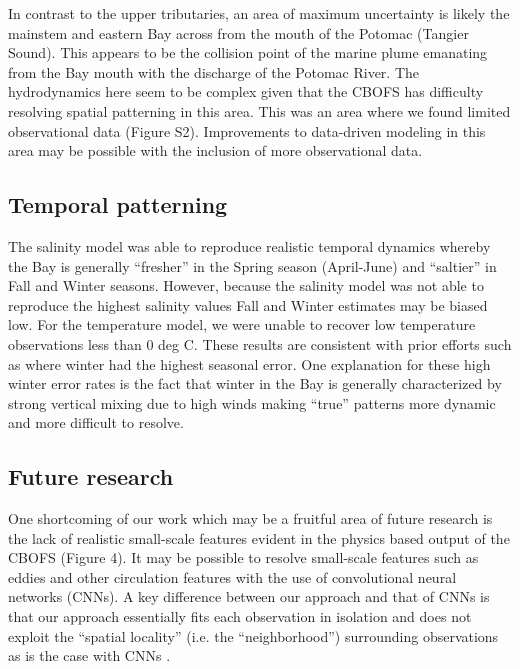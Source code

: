 \documentclass{article}
\begin{document}
In contrast to the upper tributaries, an area of maximum uncertainty is likely the mainstem and eastern Bay across from the mouth of the Potomac (Tangier Sound). This appears to be the collision point of the marine plume emanating from the Bay mouth with the discharge of the Potomac River. The hydrodynamics here seem to be complex given that the CBOFS has difficulty resolving spatial patterning in this area. This was an area where we found limited observational data (Figure S2). Improvements to data-driven modeling in this area may be possible with the inclusion of more observational data.

\subsection{Temporal patterning}

The salinity model was able to reproduce realistic temporal dynamics whereby the Bay is generally “fresher” in the Spring season (April-June) and “saltier” in Fall and Winter seasons. However, because the salinity model was not able to reproduce the highest salinity values Fall and Winter estimates may be biased low. For the temperature model, we were unable to recover low temperature observations less than 0 deg C. These results are consistent with prior efforts such as \citet{geigerSatellitederivedCoastalOcean2013} where winter had the highest seasonal error. One explanation for these high winter error rates is the fact that winter in the Bay is generally characterized by strong vertical mixing due to high winds \citep{sonWaterPropertiesChesapeake2012, xuClimateForcingSalinity2012} making “true” patterns more dynamic and more difficult to resolve.


\subsection{Future research}

One shortcoming of our work which may be a fruitful area of future research is the lack of realistic small-scale features evident in the physics based output of the CBOFS (Figure 4). It may be possible to resolve small-scale features such as eddies and other circulation features with the use of convolutional neural networks (CNNs). A key difference between our approach and that of CNNs is that our approach essentially fits each observation in isolation and does not exploit the “spatial locality” (i.e. the “neighborhood”) surrounding observations as is the case with CNNs \citep{goodfellow2016convolutional}. 
\end{document}
